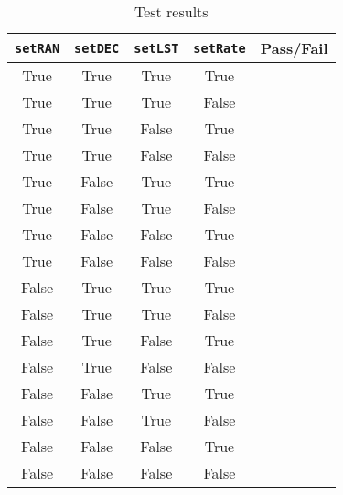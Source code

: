 \begin{table}[H]
	\caption{Test results}
	\label{tab:results}
	\centering \fontsize{10}{10}\selectfont
	\begin{tabular}{c | c  | c | c | c } %
		\hline\hline
		{\tt setRAN} & {\tt setDEC} & {\tt setLST} & {\tt setRate} &\textbf{Pass/Fail} \\ 
		\hline
	   True & True & True & True &  \\ 
	   True & True & True & False &  \\ 
	   True & True & False & True &  \\ 
	   True & True & False & False &  \\ 
	   True & False & True & True &  \\ 
	   True & False & True & False &  \\ 
	   True & False & False & True &  \\ 
	   True & False & False & False &  \\ 
	   False & True & True & True &  \\ 
	   False & True & True & False &  \\ 
	   False & True & False & True &  \\ 
	   False & True & False & False &  \\ 
	   False & False & True & True &  \\ 
	   False & False & True & False &  \\ 
	   False & False & False & True &  \\ 
	   False & False & False & False &  \\ 
	   \hline\hline
	\end{tabular}
\end{table}

